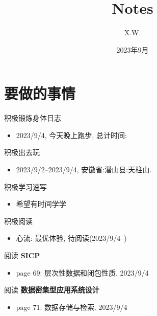 \documentclass[a4,10pt]{ctexart}
\begin{document}
\title{Notes}
\author{X.W.}
\date{2023年9月}
\maketitle
\tableofcontents
\newpage
{}
\newpage


\section{要做的事情}

\begin{yd}{积极锻炼身体日志}{}
	\begin{itemize}
		\item 2023/9/4, 今天晚上跑步, 总计时间:
	\end{itemize}
\end{yd}

\begin{yd}{积极出去玩}{}
	\begin{itemize}
		\item 2023/9/2--2023/9/4, 安徽省:潜山县:天柱山.
	\end{itemize}
\end{yd}

\begin{yd}{积极学习速写}{}
	\begin{itemize}
		\item 希望有时间学学
	\end{itemize}
\end{yd}

\begin{yd}{积极阅读}{}
	\begin{itemize}
		\item 心流: 最优体验, 待阅读(2023/9/4--)
	\end{itemize}
\end{yd}


\begin{yd}{阅读 \textbf{SICP}}{}
	\begin{itemize}
		\item page 69: 层次性数据和闭包性质. 2023/9/4
	\end{itemize}
\end{yd}

\begin{yd}{阅读 \textbf{数据密集型应用系统设计}}{}
	\begin{itemize}
		\item page 71: 数据存储与检索. 2023/9/4
	\end{itemize}
\end{yd}
\end{document}
